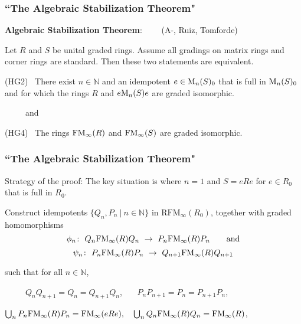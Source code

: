 \documentclass{beamer}
\newcommand{\N}{\mathbb{N}}
\begin{document}
\begin{frame}
\frametitle{``The Algebraic Stabilization Theorem"} 

{\bf Algebraic Stabilization Theorem}: \ \  \ \ (A-, Ruiz, Tomforde)

  Let $R$ and $S$ be unital graded rings.   Assume all gradings on matrix rings and corner rings are standard.   Then these two statements are equivalent.

\bigskip

(HG2) \    There exist $n\in \N$ and an idempotent $e \in {\rm M}_n(S)_0$ that is full in ${\rm M}_n(S)_0$ and for which the rings $R$ and $ e{\rm M}_n(S)e$ are graded isomorphic.
  
  \medskip
  
\ \ \ \ \   and

\medskip

(HG4)   \  The rings  ${\rm FM}_\infty(R)$ and ${\rm FM}_\infty(S)$ are graded isomorphic.    


\end{frame}

\begin{frame}
\frametitle{``The Algebraic Stabilization Theorem"}


Strategy  of the proof:   The key situation is where $n=1$ and $S = eRe$ for $e \in R_0$ that is full in $R_0$.   

\medskip


Construct idempotents $\{Q_n, P_n \ | \ n\in \mathbb{N}\}$ in  $\mathrm{RFM}_\infty(R_0)$, 
together with graded homomorphisms 
   $$ \phi_n  \colon  \ Q_n {\rm FM}_\infty(R) Q_n  \ \to \  P_n {\rm FM}_\infty(R) P_n \ \  \ \ \ \ \mbox{and} $$
   $$  \psi_n \colon \ P_n {\rm FM}_\infty(R) P_n \  \to \  Q_{n+1} {\rm FM}_\infty(R) Q_{n+1}$$
   
   

   



   


\noindent
such that for all $n\in \mathbb{N}$,

\medskip

  
  \ \ \ \ \   $Q_{n}Q_{n+1} = Q_n = Q_{n+1} Q_n$, \ \ \ 
  $P_n P_{n+1} = P_n = P_{n+1} P_n$,
   
       \bigskip
    
   $ \bigcup_n P_n {\rm FM}_\infty(R) P_n = {\rm FM}_\infty( eRe ), \  \  \ \bigcup_n Q_n {\rm FM}_\infty(R) Q_n = {\rm FM}_\infty(R)$, 




\end{frame}
\end{document}
